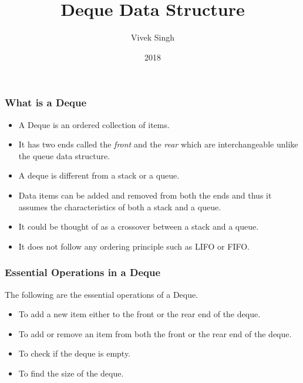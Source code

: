 \documentclass{beamer}
\title{Deque Data Structure}
\author{Vivek Singh}
\institute{Information Systems Decision Sciences (ISDS)\\
MUMA College of Business\\
University of South Florida \\
Tampa, Florida}
\date{2018}
\begin{document}
 
\frame{\titlepage}
 
\begin{frame}
\frametitle{What is a Deque}
\begin{itemize}

\item A Deque is an ordered collection of items.

\item It has two ends called the \textit{front} and the \textit{rear} which are interchangeable unlike the queue data structure.

\item A deque is different from a stack or a queue.

\item Data items can be added and removed from both the ends and thus it assumes the characteristics of both a stack and a queue. 

\item It could be thought of as a crossover between a stack and a queue.

\item It does not follow any ordering principle such as LIFO or FIFO.


\end{itemize}
\end{frame}


\begin{frame}
\frametitle{Essential Operations in a Deque}
The following are the essential operations of a Deque.
\begin{itemize}

\item To add a new item either to the front or the rear end of the deque.

\item To add or remove an item from both the front or the rear end of the deque.

\item To check if the deque is empty.

\item To find the size of the deque.

\end{itemize}
\end{frame}
\end{document}
